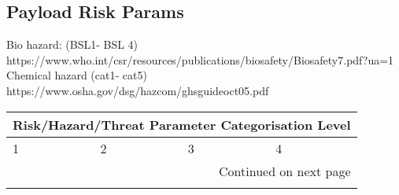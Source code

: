 \documentclass{ua_wgs_base}
\begin{document}
\subsection{Payload Risk Params}
Bio hazard: (BSL1- BSL 4) https://www.who.int/csr/resources/publications/biosafety/Biosafety7.pdf?ua=1 \\
Chemical hazard (cat1- cat5) https://www.osha.gov/dsg/hazcom/ghsguideoct05.pdf


\begin{centering}
\small
  \ttfamily
\begin{longtable}{|l|l|l|l|}
 \hline
 \multicolumn{4}{|c|}{Risk/Hazard/Threat Parameter Categorisation Level} \\
 \hline
 1 & 2 & 3 & 4 \\
 \hline
  \endhead
  \hline \multicolumn{4}{|r|}{{Continued on next page}} \\ \hline
  \endfoot


\end{longtable}
\end{centering}
\end{document}
